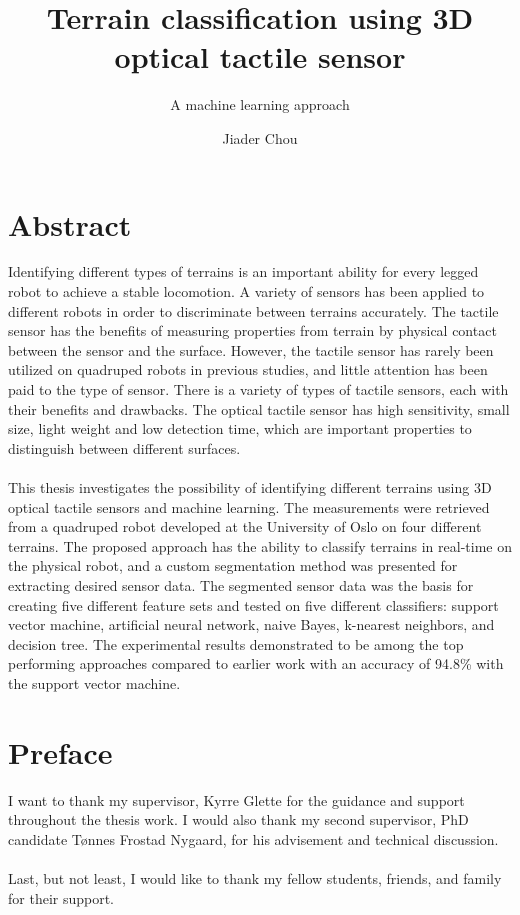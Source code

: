 \documentclass[USenglish]{ifimaster}  %
\title{Terrain classification using 3D optical tactile sensor}        %
\subtitle{A machine learning approach}
\date{}
\author{Jiader Chou}                      %
\begin{document}
	\ififorside{}
	\frontmatter{}
	\maketitle{}
	
	\frontmatter{}
\chapter*{Abstract}                   %
Identifying different types of terrains is an important ability for every legged robot to achieve a stable locomotion. A variety of sensors has been applied to different robots in order to discriminate between terrains accurately. The tactile sensor has the benefits of measuring properties from terrain by physical contact between the sensor and the surface. However, the tactile sensor has rarely been utilized on quadruped robots in previous studies, and little attention has been paid to the type of sensor. There is a variety of types of tactile sensors, each with their benefits and drawbacks. The optical tactile sensor has high sensitivity, small size, light weight and low detection time, which are important properties to distinguish between different surfaces. 
\\
\\
This thesis investigates the possibility of identifying different terrains using 3D optical tactile sensors and machine learning. The measurements were retrieved from a quadruped robot developed at the University of Oslo on four different terrains. The proposed approach has the ability to classify terrains in real-time on the physical robot, and a custom segmentation method was presented for extracting desired sensor data. The segmented sensor data was the basis for creating five different feature sets and tested on five different classifiers: support vector machine, artificial neural network, naive Bayes, k-nearest neighbors, and decision tree. The experimental results demonstrated to be among the top performing approaches compared to earlier work with an accuracy of 94.8\% with the support vector machine.



\tableofcontents{}
\listoffigures{}
\listoftables{}
	
\chapter*{Preface}                    %
I want to thank my supervisor, Kyrre Glette for the guidance and support throughout the thesis work. I would also thank my second supervisor, PhD candidate Tønnes Frostad Nygaard, for his advisement and technical discussion.
\\
\\
Last, but not least, I would like to thank my fellow students, friends, and family for their support.
\end{document}

